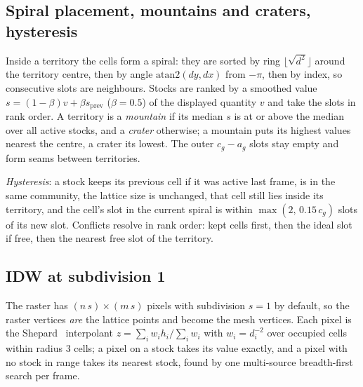 \documentclass[preprint,3p,twocolumn]{elsarticle}
\begin{document}
\subsection{Spiral placement, mountains and craters, hysteresis}
Inside a territory the cells form a spiral: they are sorted by ring $\lfloor\sqrt{d^2}\rfloor$ around the territory centre, then by angle $\mathrm{atan2}(dy,dx)$ from $-\pi$, then by index, so consecutive slots are neighbours. Stocks are ranked by a smoothed value $s=(1-\beta)v+\beta s_{\mathrm{prev}}$ ($\beta=0.5$) of the displayed quantity $v$ and take the slots in rank order. A territory is a \emph{mountain} if its median $s$ is at or above the median over all active stocks, and a \emph{crater} otherwise; a mountain puts its highest values nearest the centre, a crater its lowest. The outer $c_g-a_g$ slots stay empty and form seams between territories.

\emph{Hysteresis}: a stock keeps its previous cell if it was active last frame, is in the same community, the lattice size is unchanged, that cell still lies inside its territory, and the cell's slot in the current spiral is within $\max(2,\,0.15\,c_g)$ slots of its new slot. Conflicts resolve in rank order: kept cells first, then the ideal slot if free, then the nearest free slot of the territory.

\subsection{IDW at subdivision 1}
The raster has $(n\,s)\times(m\,s)$ pixels with subdivision $s=1$ by default, so the raster vertices \emph{are} the lattice points and become the mesh vertices. Each pixel is the Shepard~\cite{shepard} interpolant $z=\sum_i w_i h_i/\sum_i w_i$ with $w_i=d_i^{-2}$ over occupied cells within radius 3 cells; a pixel on a stock takes its value exactly, and a pixel with no stock in range takes its nearest stock, found by one multi-source breadth-first search per frame.
\end{document}

